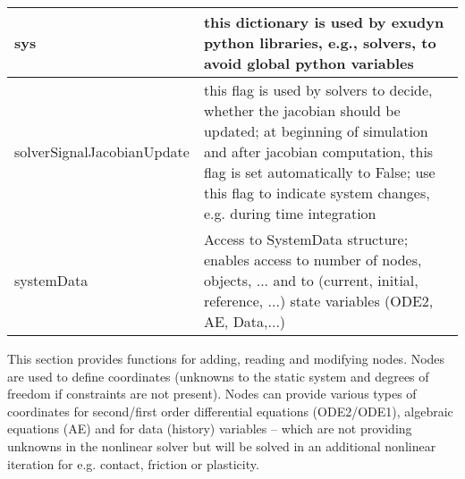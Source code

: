 \begin{center}
\begin{longtable}{| p{8cm} | p{8cm} |}
  sys & this dictionary is used by exudyn python libraries, e.g., solvers, to avoid global python variables \\ \hline 
  solverSignalJacobianUpdate & this flag is used by solvers to decide, whether the jacobian should be updated; at beginning of simulation and after jacobian computation, this flag is set automatically to False; use this flag to indicate system changes, e.g. during time integration  \\ \hline  
  systemData & Access to SystemData structure; enables access to number of nodes, objects, ... and to (current, initial, reference, ...) state variables (ODE2, AE, Data,...)\\ \hline  
\end{longtable}
\end{center}

\label{sec:mainsystem:node}
 This section provides functions for adding, reading and modifying nodes. Nodes are used to define coordinates (unknowns to the static system and degrees of freedom if constraints are not present). Nodes can provide various types of coordinates for second/first order differential equations (ODE2/ODE1), algebraic equations (AE) and for data (history) variables -- which are not providing unknowns in the nonlinear solver but will be solved in an additional nonlinear iteration for e.g. contact, friction or plasticity.

